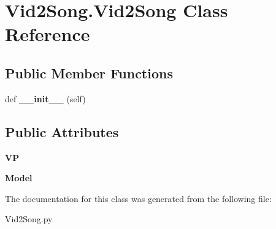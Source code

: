 \hypertarget{class_vid2_song_1_1_vid2_song}{}\section{Vid2\+Song.\+Vid2\+Song Class Reference}
\label{class_vid2_song_1_1_vid2_song}
\subsection*{Public Member Functions}
\begin{DoxyCompactItemize}
\item 
\mbox{\label{class_vid2_song_1_1_vid2_song_aa29126a4bc5eb41a461616468be3d483}} 
def {\bfseries \+\_\+\+\_\+init\+\_\+\+\_\+} (self)
\end{DoxyCompactItemize}
\subsection*{Public Attributes}
\begin{DoxyCompactItemize}
\item 
\mbox{\label{class_vid2_song_1_1_vid2_song_a0ba405d29091bfaefb82ee62092160c9}} 
{\bfseries VP}
\item 
\mbox{\label{class_vid2_song_1_1_vid2_song_adebafb6f9582345acbe2ca44a7882917}} 
{\bfseries Model}
\end{DoxyCompactItemize}


The documentation for this class was generated from the following file\+:\begin{DoxyCompactItemize}
\item 
Vid2\+Song.\+py\end{DoxyCompactItemize}
